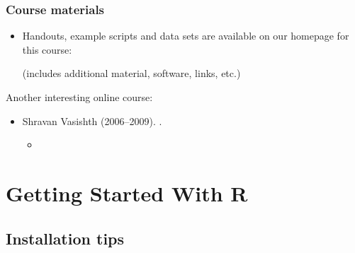 \documentclass[t]{beamer} %
\begin{document}
\begin{frame}
  \frametitle{Course materials}

  \begin{itemize}
  \item Handouts, example scripts and data sets are available on our homepage
    for this course:\\[4mm]
    \begin{center}
    \end{center}
    \gap[.5]
    (includes additional material, software, links, etc.)
  \end{itemize}

  \gap[3]
  Another interesting online course:
  \begin{itemize}
  \item Shravan Vasishth (2006--2009). .
    \begin{itemize}
    \item {}
    \end{itemize}
  \end{itemize}
\end{frame}

\section{Getting Started With R}

\subsection{Installation tips}
\end{document}
